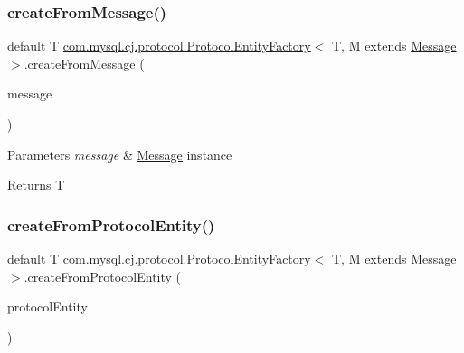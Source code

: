\subsubsection{\texorpdfstring{create\+From\+Message()}{createFromMessage()}}
{\footnotesize\ttfamily default T \mbox{\hyperlink{interfacecom_1_1mysql_1_1cj_1_1protocol_1_1_protocol_entity_factory}{com.\+mysql.\+cj.\+protocol.\+Protocol\+Entity\+Factory}}$<$ T, M extends \mbox{\hyperlink{interfacecom_1_1mysql_1_1cj_1_1protocol_1_1_message}{Message}} $>$.create\+From\+Message (\begin{DoxyParamCaption}\item[{M}]{message }\end{DoxyParamCaption})}


\begin{DoxyParams}{Parameters}
{\em message} & \mbox{\hyperlink{interfacecom_1_1mysql_1_1cj_1_1protocol_1_1_message}{Message}} instance \\
\hline
\end{DoxyParams}
\begin{DoxyReturn}{Returns}
T 
\end{DoxyReturn}
\mbox{\label{interfacecom_1_1mysql_1_1cj_1_1protocol_1_1_protocol_entity_factory_a282b14fecc86c7202cd9361333235ef8}} 
\subsubsection{\texorpdfstring{create\+From\+Protocol\+Entity()}{createFromProtocolEntity()}}
{\footnotesize\ttfamily default T \mbox{\hyperlink{interfacecom_1_1mysql_1_1cj_1_1protocol_1_1_protocol_entity_factory}{com.\+mysql.\+cj.\+protocol.\+Protocol\+Entity\+Factory}}$<$ T, M extends \mbox{\hyperlink{interfacecom_1_1mysql_1_1cj_1_1protocol_1_1_message}{Message}} $>$.create\+From\+Protocol\+Entity (\begin{DoxyParamCaption}\item[{\mbox{\hyperlink{interfacecom_1_1mysql_1_1cj_1_1protocol_1_1_protocol_entity}{Protocol\+Entity}}}]{protocol\+Entity }\end{DoxyParamCaption})}


